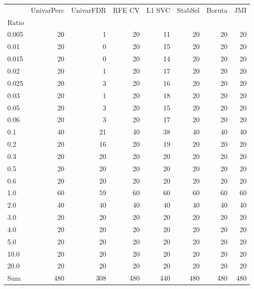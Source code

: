 \begin{tabular}{lrrrrrrr}
\toprule
{} &  UnivarPerc &  UnivarFDR &  RFE CV &  L1 SVC &  StabSel &  Boruta &  JMI \\
Ratio &             &            &         &         &          &         &      \\
\midrule
0.005 &          20 &          1 &      20 &      11 &       20 &      20 &   20 \\
0.01  &          20 &          0 &      20 &      15 &       20 &      20 &   20 \\
0.015 &          20 &          0 &      20 &      14 &       20 &      20 &   20 \\
0.02  &          20 &          1 &      20 &      17 &       20 &      20 &   20 \\
0.025 &          20 &          3 &      20 &      16 &       20 &      20 &   20 \\
0.03  &          20 &          1 &      20 &      18 &       20 &      20 &   20 \\
0.05  &          20 &          3 &      20 &      15 &       20 &      20 &   20 \\
0.06  &          20 &          3 &      20 &      17 &       20 &      20 &   20 \\
0.1   &          40 &         21 &      40 &      38 &       40 &      40 &   40 \\
0.2   &          20 &         16 &      20 &      19 &       20 &      20 &   20 \\
0.3   &          20 &         20 &      20 &      20 &       20 &      20 &   20 \\
0.5   &          20 &         20 &      20 &      20 &       20 &      20 &   20 \\
0.6   &          20 &         20 &      20 &      20 &       20 &      20 &   20 \\
1.0   &          60 &         59 &      60 &      60 &       60 &      60 &   60 \\
2.0   &          40 &         40 &      40 &      40 &       40 &      40 &   40 \\
3.0   &          20 &         20 &      20 &      20 &       20 &      20 &   20 \\
4.0   &          20 &         20 &      20 &      20 &       20 &      20 &   20 \\
5.0   &          20 &         20 &      20 &      20 &       20 &      20 &   20 \\
10.0  &          20 &         20 &      20 &      20 &       20 &      20 &   20 \\
20.0  &          20 &         20 &      20 &      20 &       20 &      20 &   20 \\
Sum   &         480 &        308 &     480 &     440 &      480 &     480 &  480 \\
\bottomrule
\end{tabular}

